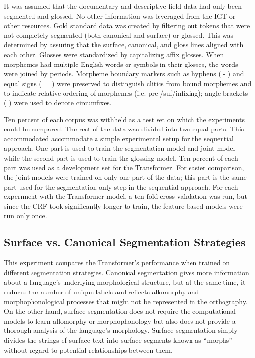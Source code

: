 It was assumed that the documentary and descriptive field data had only been segmented and glossed. No other information was leveraged from the IGT or other resources. Gold standard data was created by filtering out tokens that were not completely segmented (both canonical and surface) or glossed. This was determined by assuring that the surface, canonical, and gloss lines aligned with each other. 
Glosses were standardized by capitalizing affix glosses. When morphemes had multiple English words or symbols in their glosses, the words were joined by periods.
Morpheme boundary markers such as hyphens ( - ) and equal signs ( = ) were preserved to distinguish clitics from bound morphemes and to indicate relative ordering of morphemes (i.e. pre-/suf/infixing); angle brackets ( \textlangle{}\textrangle{} ) were used to denote circumfixes. 

Ten percent of each corpus was withheld as a test set on which the experiments could be compared. The rest of the data was divided into two equal parts. This accommodated accommodate a simple experimental setup for the sequential approach. One part is used to train the segmentation model and joint model while the second part is used to train the glossing model. Ten percent of each part was used as a development set for the Transformer. For easier comparison, the joint models were trained on only one part of the data; this part is the same part used for the segmentation-only step in the sequential approach. For each experiment with the Transformer model, a ten-fold cross validation was run, but since the CRF took significantly longer to train, the feature-based models were run only once.


\subsection{Surface vs. Canonical Segmentation Strategies}
\label{sec:sgstrategies}

This experiment compares the Transformer's performance when trained on different segmentation strategies. Canonical segmentation gives more information about a language's underlying morphological structure, but at the same time, it reduces the number of unique labels and reflects allomorphy and morphophonological processes that might not be represented in the orthography. On the other hand, surface segmentation does not require the computational models to learn allomorphy or morphophonology \citep{goldsmith_computational_2017} but also does not provide a thorough analysis of the language's morphology. Surface segmentation simply divides the strings of surface text into surface segments known as ``morphs'' without regard to potential relationships between them. 

